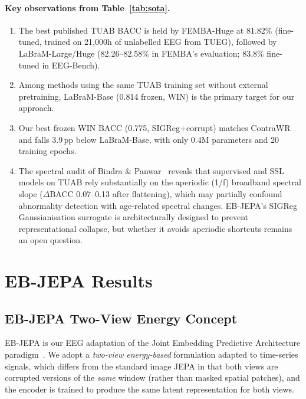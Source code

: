 \documentclass[11pt,a4paper]{article}
\begin{document}
\paragraph{Key observations from Table~\ref{tab:sota}.}
\begin{enumerate}[noitemsep]
  \item The best published TUAB BACC is held by FEMBA-Huge at 81.82\% (fine-tuned,
    trained on 21,000h of unlabelled EEG from TUEG), followed by LaBraM-Large/Huge
    (82.26--82.58\% in FEMBA's evaluation; 83.8\% fine-tuned in EEG-Bench).
  \item Among methods using the same TUAB training set without external pretraining,
    LaBraM-Base (0.814 frozen, WIN) is the primary target for our approach.
  \item Our best frozen WIN BACC (0.775, SIGReg+corrupt) matches ContraWR and falls
    3.9\,pp below LaBraM-Base, with only 0.4M parameters and 20 training epochs.
  \item The spectral audit of Bindra \& Panwar~\cite{spectral_audit} reveals that
    supervised and SSL models on TUAB rely substantially on the aperiodic (1/f)
    broadband spectral slope ($\Delta$BACC 0.07--0.13 after flattening), which may
    partially confound abnormality detection with age-related spectral changes.
    EB-JEPA's SIGReg Gaussianisation surrogate is architecturally designed to
    prevent representational collapse, but whether it avoids aperiodic shortcuts
    remains an open question.
\end{enumerate}

\section{EB-JEPA Results}
\label{sec:jepa}

\subsection{EB-JEPA Two-View Energy Concept}
\label{sec:jepa_concept}

EB-JEPA is our EEG adaptation of the Joint Embedding Predictive Architecture
paradigm~\cite{ijepa,lecun2022}.  We adopt a \emph{two-view energy-based} formulation
adapted to time-series signals, which differs from the standard image JEPA in that
both views are corrupted versions of the \emph{same} window (rather than masked
spatial patches), and the encoder is trained to produce the same latent representation
for both views.
\end{document}
